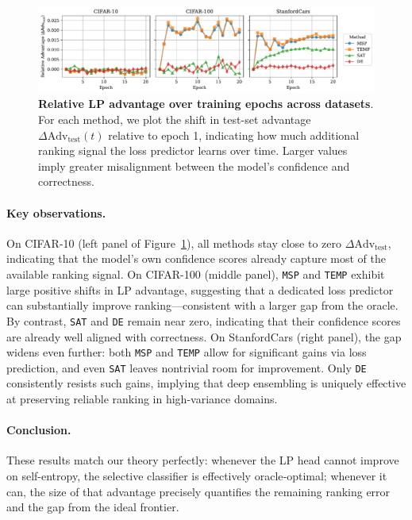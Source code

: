 \begin{figure}
    \centering
    \includegraphics[width=1\linewidth]{figs/sc_bounds/adv_te.pdf}
    \caption[Relative LP advantage over training epochs across datasets.]{\textbf{Relative LP advantage over training epochs across datasets}. For each method, we plot the shift in test-set advantage $\Delta\mathrm{Adv}_{\mathrm{test}}(t)$ relative to epoch 1, indicating how much additional ranking signal the loss predictor learns over time. Larger values imply greater misalignment between the model’s confidence and correctness.}

    \label{fig:adv_te}
\end{figure}

\paragraph{Key observations.}
On CIFAR-10 (left panel of Figure~\ref{fig:adv_te}), all methods stay close to zero $\Delta\mathrm{Adv}_{\mathrm{test}}$, indicating that the model's own confidence scores already capture most of the available ranking signal. On CIFAR-100 (middle panel), \texttt{MSP} and \texttt{TEMP} exhibit large positive shifts in LP advantage, suggesting that a dedicated loss predictor can substantially improve ranking—consistent with a larger gap from the oracle. By contrast, \texttt{SAT} and \texttt{DE} remain near zero, indicating that their confidence scores are already well aligned with correctness. On StanfordCars (right panel), the gap widens even further: both \texttt{MSP} and \texttt{TEMP} allow for significant gains via loss prediction, and even \texttt{SAT} leaves nontrivial room for improvement. Only \texttt{DE} consistently resists such gains, implying that deep ensembling is uniquely effective at preserving reliable ranking in high-variance domains.

\paragraph{Conclusion.}  
These results match our theory perfectly: whenever the LP head cannot improve on self-entropy, the selective classifier is effectively oracle‐optimal; whenever it can, the size of that advantage precisely quantifies the remaining ranking error and the gap from the ideal frontier.


